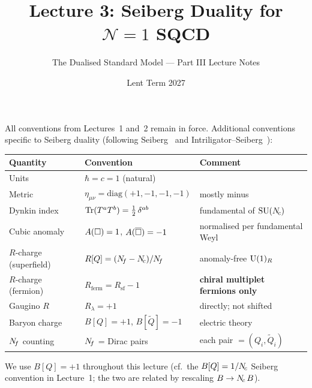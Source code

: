 \documentclass[11pt,a4paper]{article}
\title{\textbf{Lecture 3: Seiberg Duality for $\mathcal{N}=1$ SQCD}}
\author{The Dualised Standard Model --- Part III Lecture Notes}
\date{Lent Term 2027}
\begin{document}
\maketitle

\tableofcontents
\newpage


\begin{conventionbox}[title={Conventions for Lecture 3}]
All conventions from Lectures~1 and~2 remain in force.  Additional
conventions specific to Seiberg duality (following
Seiberg~\cite{Seiberg1995} and Intriligator--Seiberg~\cite{IS1995}):

\renewcommand{\arraystretch}{1.3}
\begin{tabular}{@{}l l l@{}}
\toprule
\textbf{Quantity} & \textbf{Convention} & \textbf{Comment} \\
\midrule
Units & $\hbar = c = 1$ (natural) & \\
Metric & $\eta_{\mu\nu} = \mathrm{diag}(+1,-1,-1,-1)$ & mostly minus \\
Dynkin index & $\mathrm{Tr}(T^a T^b) = \tfrac{1}{2}\, \delta^{ab}$ & fundamental of $\mathrm{SU}(N_{\!c})$ \\
Cubic anomaly & $A(\square) = 1$, $A(\overline{\square}) = -1$ & normalised per fundamental Weyl \\
$R$-charge (superfield) & $R[Q] = (N_{\!f} - N_{\!c})/N_{\!f}$ & anomaly-free $\mathrm{U}(1)_R$ \\
$R$-charge (fermion) & $R_{\text{ferm}} = R_{\text{sf}} - 1$ & \textbf{chiral multiplet fermions only} \\
Gaugino $R$ & $R_{\lambda} = +1$ & directly; not shifted \\
Baryon charge & $B[Q] = +1$,\; $B[\widetilde{Q}] = -1$ & electric theory \\
$N_{\!f}$ counting & $N_{\!f}$ = Dirac pairs & each pair $= (Q_i, \widetilde{Q}_i)$ \\
\bottomrule
\end{tabular}
\end{conventionbox}

\noindent We use $B[Q] = +1$ throughout this lecture (cf.\ the
$B[Q] = 1/N_{\!c}$ Seiberg convention in Lecture~1; the two are related
by rescaling $B \to N_{\!c}\, B$).


\end{document}
